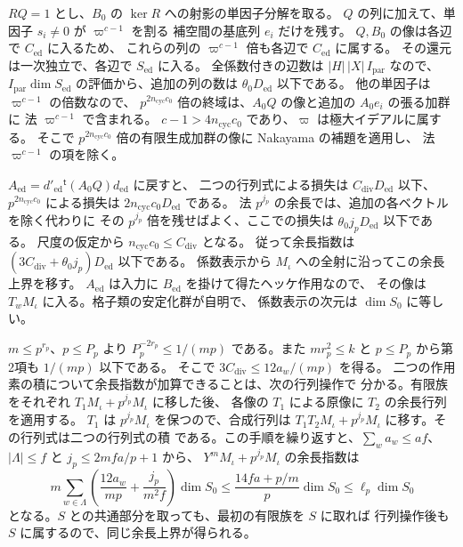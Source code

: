 \(R Q=1\) とし、\(B_0\) の \(\ker R\) への射影の単因子分解を取る。
\(Q\) の列に加えて、単因子 \(s_i\ne0\) が \(\varpi^{c-1}\) を割る
補空間の基底列 \(e_i\) だけを残す。
\(Q,B_0\) の像は各辺で \(C_\mathrm{ed}\) に入るため、
これらの列の \(\varpi^{c-1}\) 倍も各辺で \(C_\mathrm{ed}\) に属する。
その還元は一次独立で、各辺で \(S_\mathrm{ed}\) に入る。
全係数付きの辺数は \(|H|\,|X|\,I_\mathrm{par}\) なので、
\(I_\mathrm{par}\dim S_\mathrm{ed}\) の評価から、追加の列の数は
\(\theta_0D_\mathrm{ed}\) 以下である。
他の単因子は \(\varpi^{c-1}\) の倍数なので、
\(p^{2n_\mathrm{cyc}c_0}\) 倍の終域は、\(A_0Q\) の像と追加の \(A_0e_i\) の張る加群に
法 \(\varpi^{c-1}\) で含まれる。
\(c-1>4n_\mathrm{cyc}c_0\) であり、\(\varpi\) は極大イデアルに属する。
そこで \(p^{2n_\mathrm{cyc}c_0}\) 倍の有限生成加群の像に Nakayama の補題を適用し、
法 \(\varpi^{c-1}\) の項を除く。

\(A_\mathrm{ed}=d'_\mathrm{ed}{}^{\mathsf t}(A_0Q)d_\mathrm{ed}\) に戻すと、
二つの行列式による損失は \(C_{\mathrm{div}}D_\mathrm{ed}\) 以下、
\(p^{2n_\mathrm{cyc}c_0}\) による損失は \(2n_\mathrm{cyc}c_0D_\mathrm{ed}\) である。
法 \(p^{j_p}\) の余長では、追加の各ベクトルを除く代わりに
その \(p^{j_p}\) 倍を残せばよく、ここでの損失は \(\theta_0j_pD_\mathrm{ed}\) 以下である。
尺度の仮定から \(n_\mathrm{cyc}c_0\le C_{\mathrm{div}}\) となる。
従って余長指数は \((3C_{\mathrm{div}}+\theta_0j_p)D_\mathrm{ed}\) 以下である。
係数表示から \(M_\iota\) への全射に沿ってこの余長上界を移す。
\(A_\mathrm{ed}\) は入力に \(B_\mathrm{ed}\) を掛けて得たヘッケ作用なので、
その像は \(T_w M_\iota\) に入る。格子類の安定化群が自明で、
係数表示の次元は \(\dim S_0\) に等しい。

\(m\le p^{r_p}\)、\(p\le P_p\) より
\(P_p^{-2r_p}\le1/(mp)\) である。また \(mr_p^2\le k\) と
\(p\le P_p\) から第2項も \(1/(mp)\) 以下である。
そこで \(3C_{\mathrm{div}}\le12a_w/(mp)\) を得る。
二つの作用素の積について余長指数が加算できることは、次の行列操作で
分かる。有限族をそれぞれ \(T_1M_\iota+p^{j_p}M_\iota\) に移した後、
各像の \(T_1\) による原像に \(T_2\) の余長行列を適用する。
\(T_1\) は \(p^{j_p}M_\iota\) を保つので、合成行列は
\(T_1T_2M_\iota+p^{j_p}M_\iota\) に移す。その行列式は二つの行列式の積
である。この手順を繰り返すと、\(\sum_w a_w\le af\)、
\(|\Lambda|\le f\) と \(j_p\le 2mfa/p+1\) から、
\(Y^mM_\iota+p^{j_p}M_\iota\) の余長指数は
\[
  m\sum_{w\in\Lambda}
      \left(\frac{12a_w}{mp}+\frac{j_p}{m^2f}\right)\dim S_0
    \le \frac{14fa+p/m}{p}\dim S_0
    \le \ell_p\dim S_0
\]
となる。\(S\) との共通部分を取っても、最初の有限族を \(S\) に取れば
行列操作後も \(S\) に属するので、同じ余長上界が得られる。

